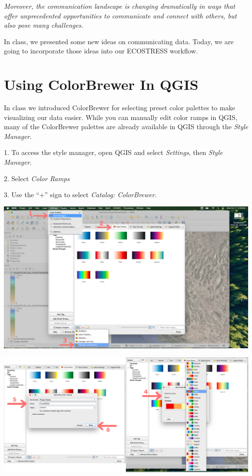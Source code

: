 \documentclass[oneside,a4paper,11pt,explicit]{book}
\begin{document}
{\begin{minipage}{.9665\textwidth}
	\vspace{.5em}

	\textit{Moreover, the communication landscape is changing dramatically in ways that offer unprecedented opportunities to communicate and connect with others, but also pose many challenges.}

	\vspace{.5em}

	In class, we presented some new ideas on communicating data. Today, we are going to incorporate those ideas into our ECOSTRESS workflow.
	
\end{minipage}}

\section{Using ColorBrewer In QGIS}

In class we introduced ColorBrewer for selecting preset color palettes to make visualizing our data easier. While you can manually edit color ramps in QGIS, many of the ColorBrewer palettes are already available in QGIS through the \textit{Style Manager}. 

1. To access the style manager, open QGIS and select \textit{Settings}, then \textit{Style Manager}.

2. Select \textit{Color Ramps}

3. Use the ``+'' sign to select \textit{Catalog: ColorBrewer}.

\centerline{\includegraphics[width=.87\textwidth]{StyleManager.png}}

\vspace{.5em}

\centerline{\includegraphics[width=.87\textwidth]{QGIScolorBrewer.png}}
\end{document}
